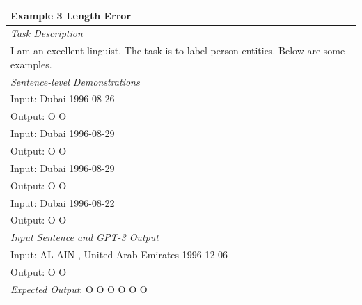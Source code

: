 \documentclass[11pt]{article}
\begin{document}
\begin{table}[th!]
{\begin{tabular}{l}
\textbf{Example 3 {\color{red} Length Error}} \\\midrule
       	\textit{Task Description} \\
I am an excellent linguist. The task is to label person entities. Below are some examples. \\\midrule
\textit{Sentence-level Demonstrations} \\
Input: Dubai 1996-08-26 \\
Output: O O \\
Input: Dubai 1996-08-29 \\
Output: O O \\
Input: Dubai 1996-08-29 \\
Output: O O \\
Input: Dubai 1996-08-22 \\
Output: O O \\\midrule
\textit{Input Sentence and GPT-3 Output} \\
Input: AL-AIN , United Arab Emirates 1996-12-06 \\
Output: O O \\
{\color{blue}\it Expected Output}: O O O O O O \\\bottomrule


\end{tabular}}
\end{table}
\end{document}
